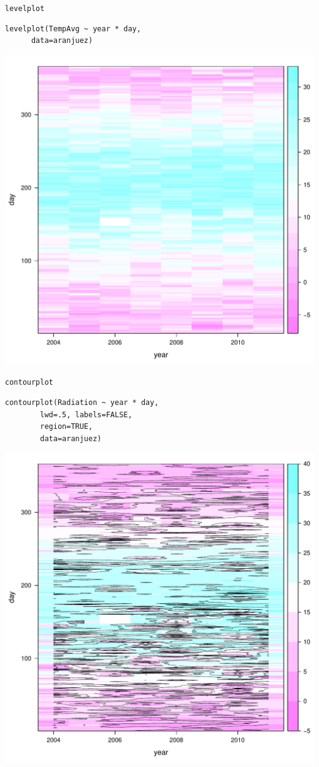 \documentclass[xcolor={usenames,svgnames,dvipsnames}]{beamer}
\begin{document}
\begin{frame}[fragile,label=sec-2-1-18]{\texttt{levelplot}}
 \lstset{language=R,numbers=none}
\begin{lstlisting}
levelplot(TempAvg ~ year * day,
	  data=aranjuez)
\end{lstlisting}

\includegraphics[width=.9\linewidth]{figs/levelplot.pdf}
\end{frame}
\begin{frame}[fragile,label=sec-2-1-19]{\texttt{contourplot}}
 \lstset{language=R,numbers=none}
\begin{lstlisting}
contourplot(Radiation ~ year * day,
	    lwd=.5, labels=FALSE,
	    region=TRUE, 
	    data=aranjuez)
\end{lstlisting}

\includegraphics[width=.9\linewidth]{figs/contourplot.pdf}
\end{frame}
\end{document}
